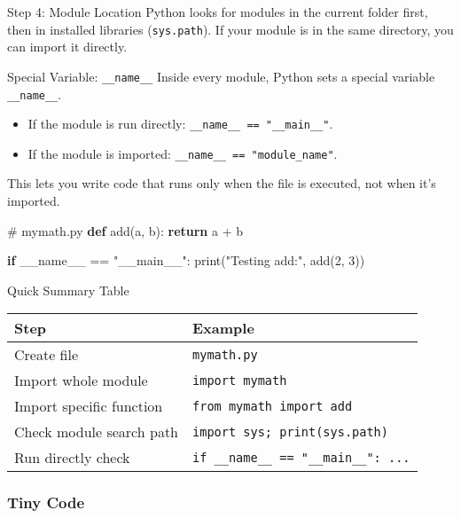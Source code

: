 \documentclass[
  letterpaper,
  DIV=11,
  numbers=noendperiod]{scrreprt}
\newenvironment{Shaded}{\begin{snugshade}}{\end{snugshade}}
\newcommand{\BuiltInTok}[1]{\textcolor[rgb]{0.00,0.23,0.31}{#1}}
\newcommand{\CommentTok}[1]{\textcolor[rgb]{0.37,0.37,0.37}{#1}}
\newcommand{\ControlFlowTok}[1]{\textcolor[rgb]{0.00,0.23,0.31}{\textbf{#1}}}
\newcommand{\DecValTok}[1]{\textcolor[rgb]{0.68,0.00,0.00}{#1}}
\newcommand{\KeywordTok}[1]{\textcolor[rgb]{0.00,0.23,0.31}{\textbf{#1}}}
\newcommand{\NormalTok}[1]{\textcolor[rgb]{0.00,0.23,0.31}{#1}}
\newcommand{\OperatorTok}[1]{\textcolor[rgb]{0.37,0.37,0.37}{#1}}
\newcommand{\StringTok}[1]{\textcolor[rgb]{0.13,0.47,0.30}{#1}}
\newcommand{\VariableTok}[1]{\textcolor[rgb]{0.07,0.07,0.07}{#1}}
\providecommand{\tightlist}{%
  \setlength{\itemsep}{0pt}\setlength{\parskip}{0pt}}
\begin{document}
Step 4: Module Location Python looks for modules in the current folder
first, then in installed libraries (\texttt{sys.path}). If your module
is in the same directory, you can import it directly.

Special Variable: \texttt{\_\_name\_\_} Inside every module, Python sets
a special variable \texttt{\_\_name\_\_}.

\begin{itemize}
\tightlist
\item
  If the module is run directly:
  \texttt{\_\_name\_\_\ ==\ "\_\_main\_\_"}.
\item
  If the module is imported: \texttt{\_\_name\_\_\ ==\ "module\_name"}.
\end{itemize}

This lets you write code that runs only when the file is executed, not
when it's imported.

\begin{Shaded}
\begin{Highlighting}[]
\CommentTok{\# mymath.py}
\KeywordTok{def}\NormalTok{ add(a, b):}
    \ControlFlowTok{return}\NormalTok{ a }\OperatorTok{+}\NormalTok{ b}

\ControlFlowTok{if} \VariableTok{\_\_name\_\_} \OperatorTok{==} \StringTok{"\_\_main\_\_"}\NormalTok{:}
    \BuiltInTok{print}\NormalTok{(}\StringTok{"Testing add:"}\NormalTok{, add(}\DecValTok{2}\NormalTok{, }\DecValTok{3}\NormalTok{))}
\end{Highlighting}
\end{Shaded}

Quick Summary Table

\begin{longtable}[]{@{}ll@{}}
\toprule\noalign{}
Step & Example \\
\midrule\noalign{}
\endhead
\bottomrule\noalign{}
\endlastfoot
Create file & \texttt{mymath.py} \\
Import whole module & \texttt{import\ mymath} \\
Import specific function & \texttt{from\ mymath\ import\ add} \\
Check module search path & \texttt{import\ sys;\ print(sys.path)} \\
Run directly check &
\texttt{if\ \_\_name\_\_\ ==\ "\_\_main\_\_":\ ...} \\
\end{longtable}

\subsubsection{Tiny Code}\label{tiny-code-45}
\end{document}
